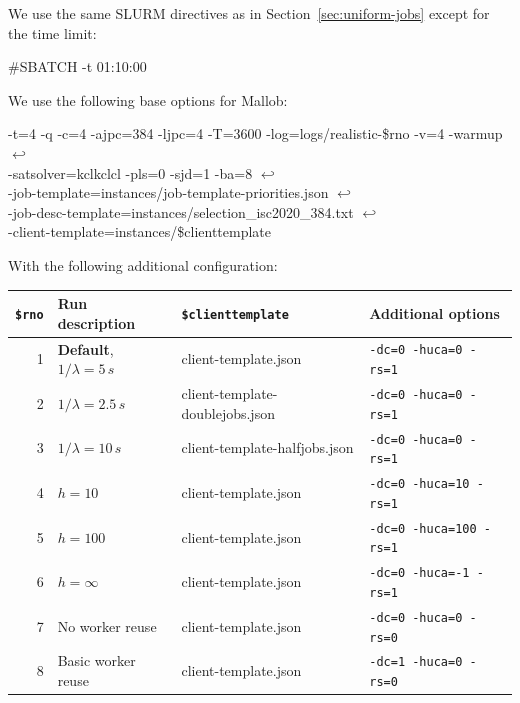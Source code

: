\documentclass[runningheads]{article}
\newcommand{\CR}{{\tiny$\hookleftarrow$}}
\numberwithin{dummy}{subsection}
\begin{document}
We use the same SLURM directives as in Section~\ref{sec:uniform-jobs} except for the time limit:
\begin{ttfenv}
\#SBATCH -t 01:10:00
\end{ttfenv}

We use the following base options for Mallob:

\begin{ttfenv}
-t=4 -q -c=4 -ajpc=384 -ljpc=4 -T=3600 -log=logs/realistic-\$rno -v=4 -warmup \CR\\
-satsolver=kclkclcl -pls=0 -sjd=1 -ba=8  \CR\\
 -job-template=instances/job-template-priorities.json  \CR\\
 -job-desc-template=instances/selection\_isc2020\_384.txt  \CR\\
 -client-template=instances/\$clienttemplate
\end{ttfenv}

With the following additional configuration:\\

{
\begin{tabular}{|r|l|l|l|}
\hline
\texttt{\$rno} & Run description & \texttt{\$clienttemplate} & Additional options \\
\hline
1 & \textbf{Default}, $1/\lambda=5\,s$ & client-template.json & \texttt{-dc=0 -huca=0 -rs=1} \\
2 & $1/\lambda=2.5\,s$ & client-template-doublejobs.json & \texttt{-dc=0 -huca=0 -rs=1} \\
3 & $1/\lambda=10\,s$ & client-template-halfjobs.json & \texttt{-dc=0 -huca=0 -rs=1} \\
\hline
4 & $h=10$ & client-template.json & \texttt{-dc=0 -huca=10 -rs=1} \\
5 & $h=100$ & client-template.json & \texttt{-dc=0 -huca=100 -rs=1} \\
6 & $h=\infty$ & client-template.json & \texttt{-dc=0 -huca=-1 -rs=1} \\
\hline
7 & No worker reuse & client-template.json & \texttt{-dc=0 -huca=0 -rs=0} \\
8 & Basic worker reuse & client-template.json & \texttt{-dc=1 -huca=0 -rs=0} \\
\hline
\end{tabular}
}
\vspace{0.4cm}
\end{document}
